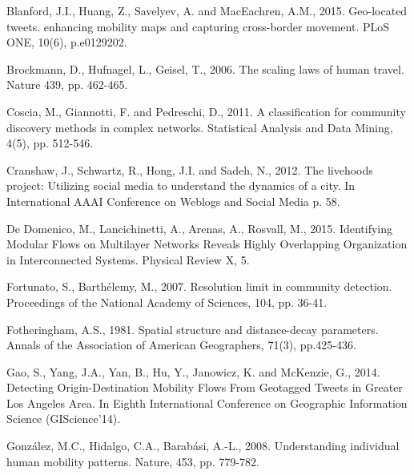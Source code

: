 \documentclass[]{tGIS2e}
\begin{document}
\begin{thebibliography}{9}
Blanford, J.I., Huang, Z., Savelyev, A. and MacEachren, A.M., 2015. Geo-located tweets. enhancing mobility maps and capturing cross-border movement. PLoS ONE, 10(6), p.e0129202.

Brockmann, D., Hufnagel, L., Geisel, T., 2006. The scaling laws of human travel. Nature 439, pp. 462-465.

Coscia, M., Giannotti, F. and Pedreschi, D., 2011. A classification for community discovery methods in complex networks. Statistical Analysis and Data Mining, 4(5), pp. 512-546.

Cranshaw, J., Schwartz, R., Hong, J.I. and Sadeh, N., 2012. The livehoods project: Utilizing social media to understand the dynamics of a city. In International AAAI Conference on Weblogs and Social Media p. 58.

De Domenico, M., Lancichinetti, A., Arenas, A., Rosvall, M., 2015. Identifying Modular Flows on Multilayer Networks Reveals Highly Overlapping Organization in Interconnected Systems. Physical Review X, 5.

Fortunato, S., Barthélemy, M., 2007. Resolution limit in community detection. Proceedings of the National Academy of Sciences, 104, pp. 36-41. 

Fotheringham, A.S., 1981. Spatial structure and distance-decay parameters. Annals of the Association of American Geographers, 71(3), pp.425-436.

Gao, S., Yang, J.A., Yan, B., Hu, Y., Janowicz, K. and McKenzie, G., 2014. Detecting Origin-Destination Mobility Flows From Geotagged Tweets in Greater Los Angeles Area. In Eighth International Conference on Geographic Information Science (GIScience'14).

González, M.C., Hidalgo, C.A., Barabási, A.-L., 2008. Understanding individual human mobility patterns. Nature, 453, pp. 779-782.


\end{thebibliography}
\end{document}
